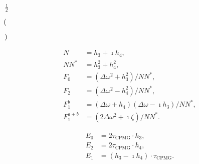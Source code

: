 \documentclass[a4paper,11pt,twoside,openright]{book}
\def\lthtmlcheckvsize{\ifdim\ht\sizebox<\vsize 
  \ifdim\wd\sizebox<\hsize\expandafter\hfill\fi \expandafter\vfill
  \else\expandafter\vss\fi}%
\begin{document}
{\newpage\clearpage
{}%
$\displaystyle {\frac{{\imath}}{{2}}}$%
\lthtmlindisplaymathZ
\lthtmlcheckvsize\clearpage}

{\newpage\clearpage
{}%
$\displaystyle \left(\vphantom{\Delta\omega - h_4}\right.$%
\lthtmlindisplaymathZ
\lthtmlcheckvsize\clearpage}

{\newpage\clearpage
{}%
$\displaystyle \left.\vphantom{\Delta\omega - h_4}\right)$%
\lthtmlindisplaymathZ
\lthtmlcheckvsize\clearpage}

{\newpage\clearpage
\setcounter{equation}{38}
%
\begin{subequations}\begin{align}
N & = h_3 + \imath h_4 , \\
NN^* & = h_3^2 + h_4^2 , \\
F_0 & = \left(\Delta\omega ^2 + h_3^2\right) / NN^* , \\
F_2 & = \left(\Delta\omega ^2 - h_4^2\right) / NN^* , \\
F_1^b & = \left(\Delta\omega + h_4\right) \left(\Delta\omega - \imath h_3\right) / NN^* , \\
F_1^{a+b} & = \left(2\Delta\omega ^2 + \imath \zeta\right) / NN^* .
\end{align}\end{subequations}%
\lthtmldisplayZ
\lthtmlcheckvsize\clearpage}

{\newpage\clearpage
\setcounter{equation}{39}
%
\begin{subequations}\begin{align}
E_0 & =  2 \tau_{\textrm{CPMG}}\cdot h_3 , \\
E_2 & =  2 \tau_{\textrm{CPMG}}\cdot  h_4 , \\
E_1 & = (h_3 - \imath h_4) \cdot \tau_{\textrm{CPMG}}.
\end{align}\end{subequations}%
\lthtmldisplayZ
\lthtmlcheckvsize\clearpage}
\end{document}
